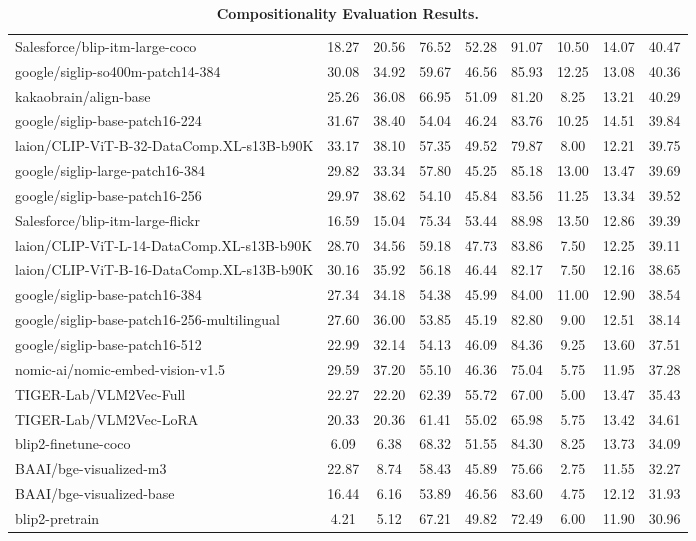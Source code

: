 \begin{table*}
{\begin{tabular}{lcccccccc}
Salesforce/blip-itm-large-coco &18.27 &20.56 &76.52 &52.28 &91.07 &10.50 &14.07 &40.47 \\
google/siglip-so400m-patch14-384 &30.08 &34.92 &59.67 &46.56 &85.93 &12.25 &13.08 &40.36 \\
kakaobrain/align-base &25.26 &36.08 &66.95 &51.09 &81.20 &8.25 &13.21 &40.29 \\
google/siglip-base-patch16-224 &31.67 &38.40 &54.04 &46.24 &83.76 &10.25 &14.51 &39.84 \\
laion/CLIP-ViT-B-32-DataComp.XL-s13B-b90K &33.17 &38.10 &57.35 &49.52 &79.87 &8.00 &12.21 &39.75 \\
google/siglip-large-patch16-384 &29.82 &33.34 &57.80 &45.25 &85.18 &13.00 &13.47 &39.69 \\
google/siglip-base-patch16-256 &29.97 &38.62 &54.10 &45.84 &83.56 &11.25 &13.34 &39.52 \\
Salesforce/blip-itm-large-flickr &16.59 &15.04 &75.34 &53.44 &88.98 &13.50 &12.86 &39.39 \\
laion/CLIP-ViT-L-14-DataComp.XL-s13B-b90K &28.70 &34.56 &59.18 &47.73 &83.86 &7.50 &12.25 &39.11 \\
laion/CLIP-ViT-B-16-DataComp.XL-s13B-b90K &30.16 &35.92 &56.18 &46.44 &82.17 &7.50 &12.16 &38.65 \\
google/siglip-base-patch16-384 &27.34 &34.18 &54.38 &45.99 &84.00 &11.00 &12.90 &38.54 \\
google/siglip-base-patch16-256-multilingual &27.60 &36.00 &53.85 &45.19 &82.80 &9.00 &12.51 &38.14 \\
google/siglip-base-patch16-512 &22.99 &32.14 &54.13 &46.09 &84.36 &9.25 &13.60 &37.51 \\
nomic-ai/nomic-embed-vision-v1.5 &29.59 &37.20 &55.10 &46.36 &75.04 &5.75 &11.95 &37.28 \\
TIGER-Lab/VLM2Vec-Full &22.27 &22.20 &62.39 &55.72 &67.00 &5.00 &13.47 &35.43 \\
TIGER-Lab/VLM2Vec-LoRA &20.33 &20.36 &61.41 &55.02 &65.98 &5.75 &13.42 &34.61 \\
blip2-finetune-coco &6.09 &6.38 &68.32 &51.55 &84.30 &8.25 &13.73 &34.09 \\
BAAI/bge-visualized-m3 &22.87 &8.74 &58.43 &45.89 &75.66 &2.75 &11.55 &32.27 \\
BAAI/bge-visualized-base &16.44 &6.16 &53.89 &46.56 &83.60 &4.75 &12.12 &31.93 \\
blip2-pretrain &4.21 &5.12 &67.21 &49.82 &72.49 &6.00 &11.90 &30.96 \\
\bottomrule
\end{tabular}}
\caption{\textbf{Compositionality Evaluation Results.}}
\label{tab: compositionality}
\end{table*}